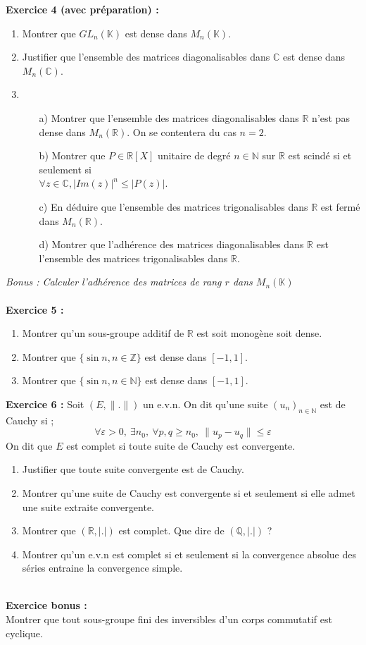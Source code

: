 \documentclass[11pt,a4paper]{article}
\begin{document}
\textbf{Exercice 4 (avec préparation) :}
\begin{enumerate}
\item Montrer que $GL_n(\mathbb{K})$ est dense dans $M_n(\mathbb{K})$.
\item Justifier que l'ensemble des matrices diagonalisables dans $\mathbb{C}$ est dense dans $M_n(\mathbb{C})$.
\item 
\begin{itemize}
\item[a)] Montrer que l’ensemble des matrices diagonalisables dans $\mathbb{R}$ n’est pas dense dans $M_n(\mathbb{R})$. On se contentera du cas $n=2$.
\item[b)] Montrer que $P\in \mathbb{R}[X]$ unitaire de degré $n\in \mathbb{N}$ sur $\mathbb{R}$ est scindé si et seulement si \\ $ \forall z \in \mathbb{C},|Im(z)|^n \leq |P(z)|$.
\item[c)] En déduire que l'ensemble des matrices trigonalisables dans $\mathbb{R}$ est fermé dans $M_n(\mathbb{R})$.
\item[d)]  Montrer que l’adhérence des matrices diagonalisables dans $\mathbb{R}$ est l’ensemble des matrices
trigonalisables dans $\mathbb{R}$.
\end{itemize}
\end{enumerate}
\textit{Bonus : Calculer l'adhérence des matrices de rang $r$ dans $M_n(\mathbb{K})$} \\
~\\

\textbf{Exercice 5 :}
\begin{enumerate}
\item Montrer qu'un sous-groupe additif de $\mathbb{R}$ est soit monogène soit dense.
\item Montrer que $ \lbrace \sin{n}, n \in \mathbb{Z} \rbrace $ est dense dans $[-1,1]$.
\item Montrer que $ \lbrace \sin{n}, n \in \mathbb{N} \rbrace $ est dense dans $[-1,1]$.
\end{enumerate}
\newpage

\textbf{Exercice 6 :}
Soit $(E,\|.\|)$ un e.v.n. On dit qu'une suite $(u_n)_{n \in \mathbb{N}}$ est de Cauchy si ; \[\forall \varepsilon >0, \ \exists n_0, \ \forall p,q \geq n_0,\ \| u_p - u_q \|\leq \varepsilon\]
On dit que $E$ est complet si toute suite de Cauchy est convergente.
\begin{enumerate}
\item Justifier que toute suite convergente est de Cauchy.
\item Montrer qu'une suite de Cauchy est convergente si et seulement si elle admet une suite extraite convergente.
\item Montrer que $(\mathbb{R},|.|)$ est complet. Que dire de $(\mathbb{Q},|.|)$ ?
\item Montrer qu'un e.v.n est complet si et seulement si la convergence absolue des séries entraine la convergence simple.
\end{enumerate}
~\\

\textbf{Exercice bonus :} \\
Montrer que tout sous-groupe fini des inversibles d'un corps commutatif est cyclique. \
\end{document}
